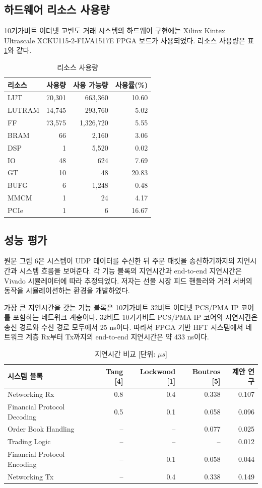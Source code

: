 \documentclass[11pt,a4paper]{article}
\begin{document}
\subsection{하드웨어 리소스 사용량}
10기가비트 이더넷 고빈도 거래 시스템의 하드웨어 구현에는 Xilinx Kintex Ultrascale XCKU115-2-FLVA1517E FPGA 보드가 사용되었다. 리소스 사용량은 표 \ref{tab:resource}와 같다.

\begin{table}[h]
\centering
\caption{리소스 사용량}
\label{tab:resource}
\begin{tabular}{lrrr}
\toprule
리소스 & 사용량 & 사용 가능량 & 사용률(\%) \\
\midrule
LUT & 70,301 & 663,360 & 10.60 \\
LUTRAM & 14,745 & 293,760 & 5.02 \\
FF & 73,575 & 1,326,720 & 5.55 \\
BRAM & 66 & 2,160 & 3.06 \\
DSP & 1 & 5,520 & 0.02 \\
IO & 48 & 624 & 7.69 \\
GT & 10 & 48 & 20.83 \\
BUFG & 6 & 1,248 & 0.48 \\
MMCM & 1 & 24 & 4.17 \\
PCIe & 1 & 6 & 16.67 \\
\bottomrule
\end{tabular}
\end{table}

\subsection{성능 평가}
원문 그림 6은 시스템이 UDP 데이터를 수신한 뒤 주문 패킷을 송신하기까지의 지연시간과 시스템 흐름을 보여준다. 각 기능 블록의 지연시간과 end-to-end 지연시간은 Vivado 시뮬레이터에 따라 추정되었다. 저자는 선물 시장 피드 핸들러와 거래 서버의 동작을 시뮬레이션하는 환경을 개발하였다.

가장 큰 지연시간을 갖는 기능 블록은 10기가비트 32비트 이더넷 PCS/PMA IP 코어를 포함하는 네트워크 계층이다. 32비트 10기가비트 PCS/PMA IP 코어의 지연시간은 송신 경로와 수신 경로 모두에서 25 ns이다. 따라서 FPGA 기반 HFT 시스템에서 네트워크 계층 Rx부터 Tx까지의 end-to-end 지연시간은 약 433 ns이다.

\begin{table}[h]
\centering
\caption{지연시간 비교 [단위: \(\mu s\)]}
\label{tab:latency-comparison}
\begin{tabular}{lrrrr}
\toprule
시스템 블록 & Tang [4] & Lockwood [1] & Boutros [5] & 제안 연구 \\
\midrule
Networking Rx & 0.8 & 0.4 & 0.338 & 0.107 \\
Financial Protocol Decoding & 0.5 & 0.1 & 0.058 & 0.096 \\
Order Book Handling & -- & -- & 0.077 & 0.025 \\
Trading Logic & -- & -- & -- & 0.012 \\
Financial Protocol Encoding & -- & 0.1 & 0.058 & 0.044 \\
Networking Tx & -- & 0.4 & 0.338 & 0.149 \\
\bottomrule
\end{tabular}
\end{table}
\end{document}
